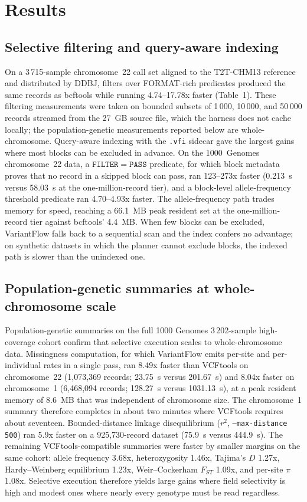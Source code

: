 \section{Results}

\subsection{Selective filtering and query-aware indexing}

On a 3\,715-sample chromosome~22 call set aligned to the T2T-CHM13 reference
\citep{t2tchm13} and distributed by DDBJ, filters over FORMAT-rich predicates produced the same records as bcftools
while running 4.74--17.78x faster (Table~1). These filtering measurements were taken on
bounded subsets of 1\,000, 10\,000, and 50\,000 records streamed from the 27~GB
source file, which the harness does not cache locally; the population-genetic
measurements reported below are whole-chromosome.
Query-aware indexing with the \texttt{.vfi}
sidecar gave the largest gains where most blocks can be excluded in advance. On
the 1000~Genomes chromosome~22 data, a
$\mathtt{FILTER}=\mathtt{PASS}$ predicate, for which block metadata proves that
no record in a skipped block can pass, ran 123--273x faster (0.213~s versus
58.03~s at the one-million-record tier), and a block-level allele-frequency
threshold predicate ran 4.70--4.93x faster. The
allele-frequency path trades memory for speed, reaching a 66.1~MB peak resident
set at the one-million-record tier against bcftools' 4.4~MB. When few blocks can
be excluded, VariantFlow falls back to a sequential scan and the index confers
no advantage; on synthetic datasets in which the planner cannot exclude blocks,
the indexed path is slower than the unindexed one.

\subsection{Population-genetic summaries at whole-chromosome scale}

Population-genetic summaries on the full 1000 Genomes 3\,202-sample
high-coverage cohort \citep{tgp_highcov} confirm that
selective execution scales to whole-chromosome data. Missingness computation, for which
VariantFlow emits per-site and per-individual rates in a single pass, ran
8.49x faster than VCFtools on chromosome~22 (1,073,369 records; 23.75~s versus
201.67~s) and 8.04x faster on chromosome~1 (6,468,094 records; 128.27~s versus
1031.13~s), at a peak resident memory of 8.6~MB that was independent of
chromosome size. The chromosome~1 summary therefore completes in about two
minutes where VCFtools requires about seventeen. Bounded-distance linkage
disequilibrium ($r^{2}$, \texttt{--max-distance 500}) ran 5.9x faster on a
925,730-record dataset (75.9~s versus 444.9~s). The remaining VCFtools-compatible summaries were faster by smaller
margins on the same cohort: allele frequency 3.68x, heterozygosity 1.46x,
Tajima's $D$ 1.27x, Hardy--Weinberg equilibrium 1.23x, Weir--Cockerham $F_{ST}$
1.09x, and per-site $\pi$ 1.08x. Selective execution therefore yields large
gains where field selectivity is high and modest ones where nearly every
genotype must be read regardless.


